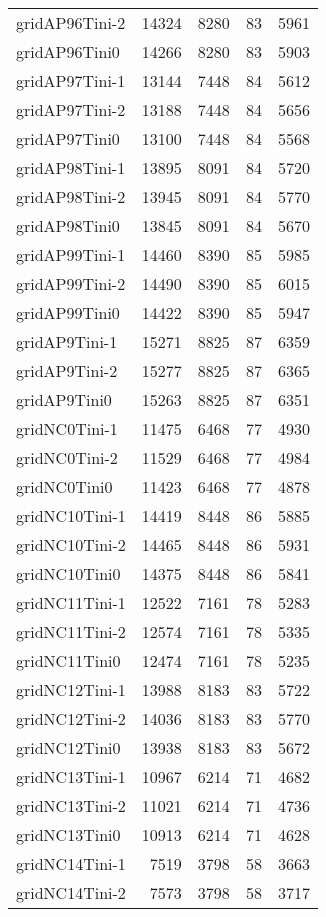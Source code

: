 \documentclass[../../../thesis.tex]{subfiles}
\begin{document}
\begin{longtable}{lrrrr}
gridAP96Tini-2 & 14324 & 8280 & 83 & 5961 \\
gridAP96Tini0 & 14266 & 8280 & 83 & 5903 \\
gridAP97Tini-1 & 13144 & 7448 & 84 & 5612 \\
gridAP97Tini-2 & 13188 & 7448 & 84 & 5656 \\
gridAP97Tini0 & 13100 & 7448 & 84 & 5568 \\
gridAP98Tini-1 & 13895 & 8091 & 84 & 5720 \\
gridAP98Tini-2 & 13945 & 8091 & 84 & 5770 \\
gridAP98Tini0 & 13845 & 8091 & 84 & 5670 \\
gridAP99Tini-1 & 14460 & 8390 & 85 & 5985 \\
gridAP99Tini-2 & 14490 & 8390 & 85 & 6015 \\
gridAP99Tini0 & 14422 & 8390 & 85 & 5947 \\
gridAP9Tini-1 & 15271 & 8825 & 87 & 6359 \\
gridAP9Tini-2 & 15277 & 8825 & 87 & 6365 \\
gridAP9Tini0 & 15263 & 8825 & 87 & 6351 \\
gridNC0Tini-1 & 11475 & 6468 & 77 & 4930 \\
gridNC0Tini-2 & 11529 & 6468 & 77 & 4984 \\
gridNC0Tini0 & 11423 & 6468 & 77 & 4878 \\
gridNC10Tini-1 & 14419 & 8448 & 86 & 5885 \\
gridNC10Tini-2 & 14465 & 8448 & 86 & 5931 \\
gridNC10Tini0 & 14375 & 8448 & 86 & 5841 \\
gridNC11Tini-1 & 12522 & 7161 & 78 & 5283 \\
gridNC11Tini-2 & 12574 & 7161 & 78 & 5335 \\
gridNC11Tini0 & 12474 & 7161 & 78 & 5235 \\
gridNC12Tini-1 & 13988 & 8183 & 83 & 5722 \\
gridNC12Tini-2 & 14036 & 8183 & 83 & 5770 \\
gridNC12Tini0 & 13938 & 8183 & 83 & 5672 \\
gridNC13Tini-1 & 10967 & 6214 & 71 & 4682 \\
gridNC13Tini-2 & 11021 & 6214 & 71 & 4736 \\
gridNC13Tini0 & 10913 & 6214 & 71 & 4628 \\
gridNC14Tini-1 & 7519 & 3798 & 58 & 3663 \\
gridNC14Tini-2 & 7573 & 3798 & 58 & 3717 \\

\end{longtable}
\end{document}
